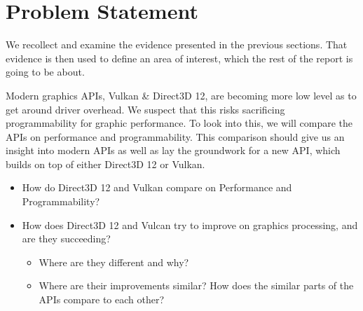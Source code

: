 \section{Problem Statement}\label{sec:problem_statement}
\begin{sectionmeta}
We recollect and examine the evidence presented in the previous sections.
That evidence is then used to define an area of interest, which the rest of the report is going to be about.
\end{sectionmeta}


\begin{problemstatement}
	Modern graphics APIs, Vulkan & Direct3D 12, are becoming more low level as to get around driver overhead.
	We suspect that this risks sacrificing programmability for graphic performance. 
	To look into this, we will compare the APIs on performance and programmability.
	This comparison should give us an insight into modern APIs as well as lay the groundwork for a new API, which builds on top of either Direct3D 12 or Vulkan.
\end{problemstatement}


\begin{itemize}
	\item How do Direct3D 12 and Vulkan compare on Performance and Programmability?
	\item How does Direct3D 12 and Vulcan try to improve on graphics processing, and are they succeeding?
	\begin{itemize}
		\item Where are they different and why?
		\item Where are their improvements similar? 
		How does the similar parts of the APIs compare to each other?
	\end{itemize}
\end{itemize}